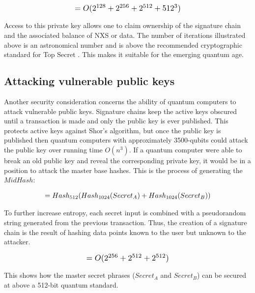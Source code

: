\documentclass[11pt]{article}
\begin{document}
\begin{equation}
\label{eq:Total Iterations to Reverse Private Key from $N_{h}$ }
\resizebox{.45\hsize}{!}
{$
= O(2^{128} + 2^{256} + 2^{512} + 512^{3})
$}
\end{equation}

\noindent Access to this private key allows one to claim ownership of the signature chain and the associated balance of NXS or data.
The number of iterations illustrated above is an astronomical number and is above the recommended cryptographic standard for Top Secret \cite{Topsecret_Standard}.
This makes it suitable for the emerging quantum age.\\

\subsection{Attacking vulnerable public keys}

\noindent Another security consideration concerns the ability of quantum computers to attack vulnerable public keys.
Signature chains keep the active keys obscured until a transaction is made and only the public key is ever published.
This protects active keys against Shor's algorithm, but once the public key is published then quantum computers with approximately 3500-qubits could attack the public key over running time $O(n^3)$.
If a quantum computer were able to break an old public key and reveal the corresponding private key, it would be in a position to attack the master base hashes.
This is the process of generating the $MidHash$:

\begin{equation}
\label{eq:}
\resizebox{.70\hsize}{!}
{$
= Hash_{512}(Hash_{1024}(Secret_{A}) + Hash_{1024}(Secret_{B}))
$}
\end{equation}

\noindent To further increase entropy, each secret input is combined with a pseudorandom string generated from the previous transaction. Thus, the creation of a signature chain is the result of hashing data points known to the user but unknown to the attacker.

\begin{equation}
\label{eq:Iterations required to discover seeds}
\resizebox{.35\hsize}{!}
{$
 = O(2^{256} + 2^{512} + 2^{512})
$}
\end{equation}

\noindent This shows how the master secret phrases ($Secret_{A}$ and $Secret_{B}$) can be secured at above a 512-bit quantum standard.\\
\end{document}

